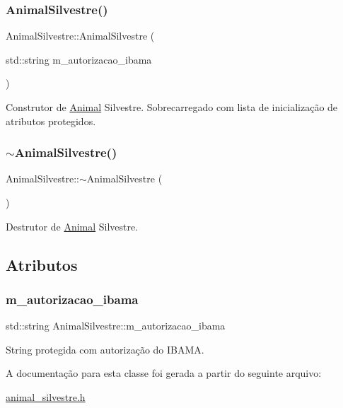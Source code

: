 \subsubsection{\texorpdfstring{Animal\+Silvestre()}{AnimalSilvestre()}}
{\footnotesize\ttfamily Animal\+Silvestre\+::\+Animal\+Silvestre (\begin{DoxyParamCaption}\item[{std\+::string}]{m\+\_\+autorizacao\+\_\+ibama }\end{DoxyParamCaption})}

Construtor de \hyperlink{classAnimal}{Animal} Silvestre. Sobrecarregado com lista de inicialização de atributos protegidos. \mbox{\label{classAnimalSilvestre_a3c7b842e393cda436f252c4eb6021aaa}} 
\subsubsection{\texorpdfstring{$\sim$\+Animal\+Silvestre()}{~AnimalSilvestre()}}
{\footnotesize\ttfamily Animal\+Silvestre\+::$\sim$\+Animal\+Silvestre (\begin{DoxyParamCaption}{ }\end{DoxyParamCaption})}

Destrutor de \hyperlink{classAnimal}{Animal} Silvestre. 

\subsection{Atributos}
\mbox{\label{classAnimalSilvestre_a921c430fa2507062e3a2605599dd6735}} 
\subsubsection{\texorpdfstring{m\+\_\+autorizacao\+\_\+ibama}{m\_autorizacao\_ibama}}
{\footnotesize\ttfamily std\+::string Animal\+Silvestre\+::m\+\_\+autorizacao\+\_\+ibama\hspace{0.3cm}{\ttfamily [protected]}}

String protegida com autorização do I\+B\+A\+MA. 

A documentação para esta classe foi gerada a partir do seguinte arquivo\+:\begin{DoxyCompactItemize}
\item 
\hyperlink{animal__silvestre_8h}{animal\+\_\+silvestre.\+h}\end{DoxyCompactItemize}
